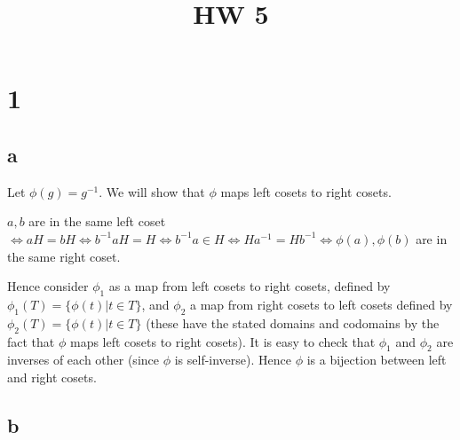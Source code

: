 \documentclass{article}
\title{HW 5}
\date{}
\def\inv{{-1}}
\begin{document}
\maketitle

\section*{1}






\subsection*{a}

Let $\phi(g) = g^\inv$. We will show that $\phi$ maps left cosets to right cosets.

$a, b$ are in the same left coset $\iff aH = bH \iff b^\inv a H = H \iff b^\inv a \in H \iff Ha^\inv = Hb^\inv \iff \phi(a), \phi(b)$ are in the same right coset.

Hence consider $\phi_1$ as a map from left cosets to right cosets, defined by $\phi_1(T) = \{ \phi(t) | t \in T\}$, and $\phi_2$ a map from right cosets to left cosets defined by $\phi_2(T) = \{ \phi(t) | t \in T\}$ (these have the stated domains and codomains by the fact that $\phi$ maps left cosets to right cosets). It is easy to check that $\phi_1$ and $\phi_2$ are inverses of each other (since $\phi$ is self-inverse). Hence $\phi$ is a bijection between left and right cosets.

\subsection*{b}
\end{document}
